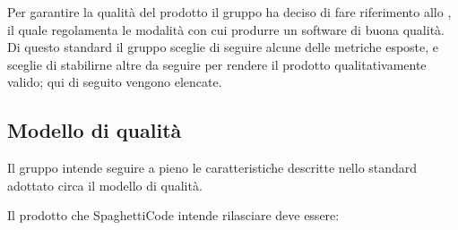 \documentclass[../piano_di_qualifica.tex]{subfiles}
\begin{document}
Per garantire la qualità del prodotto il gruppo ha deciso di fare riferimento allo , il quale regolamenta le modalità con cui produrre un software di buona qualità. Di questo standard il gruppo sceglie di seguire alcune delle metriche esposte, e sceglie di stabilirne altre da seguire per rendere il prodotto qualitativamente valido; qui di seguito vengono elencate.

\subsection{Modello di qualità}
Il gruppo intende seguire a pieno le caratteristiche descritte nello standard adottato circa il modello di qualità.\par
Il prodotto che SpaghettiCode intende rilasciare deve essere:\par
\end{document}

